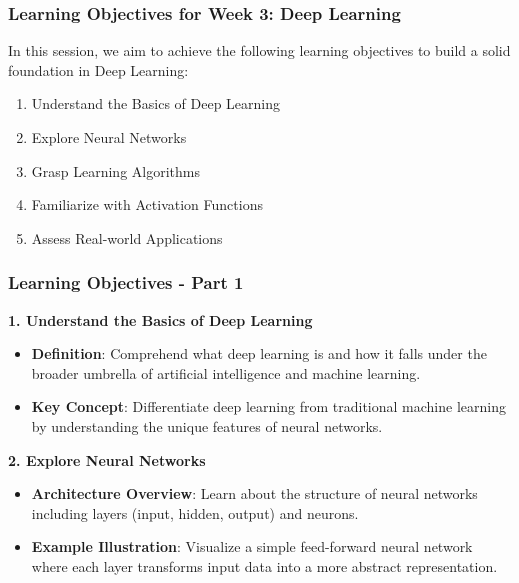 \documentclass{beamer}
\begin{document}
\begin{frame}[fragile]
    \frametitle{Learning Objectives for Week 3: Deep Learning}
    In this session, we aim to achieve the following learning objectives to build a solid foundation in Deep Learning:
    \begin{enumerate}
        \item Understand the Basics of Deep Learning
        \item Explore Neural Networks
        \item Grasp Learning Algorithms
        \item Familiarize with Activation Functions
        \item Assess Real-world Applications
    \end{enumerate}
\end{frame}

\begin{frame}[fragile]
    \frametitle{Learning Objectives - Part 1}
    \textbf{1. Understand the Basics of Deep Learning}
    \begin{itemize}
        \item \textbf{Definition}: Comprehend what deep learning is and how it falls under the broader umbrella of artificial intelligence and machine learning.
        \item \textbf{Key Concept}: Differentiate deep learning from traditional machine learning by understanding the unique features of neural networks.
    \end{itemize}

    \textbf{2. Explore Neural Networks}
    \begin{itemize}
        \item \textbf{Architecture Overview}: Learn about the structure of neural networks including layers (input, hidden, output) and neurons.
        \item \textbf{Example Illustration}: Visualize a simple feed-forward neural network where each layer transforms input data into a more abstract representation.
    \end{itemize}
\end{frame}
\end{document}
